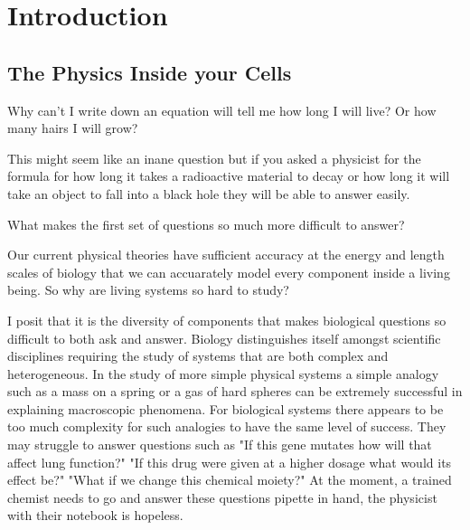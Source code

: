 \chapter{Introduction}
\setcounter{page}{1}
\label{chap:intro}
 {}

\section{The Physics Inside your Cells}
\chapquote{}{}

\vskip 0.5cm

Why can't I  write down an equation will tell me how long I will live? Or how many hairs I will grow?

This might seem like an inane question but if you asked a physicist for the formula for how long it takes a radioactive material to decay or how long it will take an object to fall into a black hole they will be able to answer easily.

What makes the first set of questions so much more difficult to answer?

Our current physical theories have sufficient accuracy at the energy and length scales of biology that we can accuarately model every component inside a living being\cite{carroll2021}. So why are living systems so hard to study?

I posit that it is the diversity of components that makes biological questions so difficult to both ask and answer. Biology distinguishes itself amongst scientific disciplines requiring the study of systems that are both complex and heterogeneous. In the study of more simple physical systems a simple analogy such as a mass on a spring or a gas of hard spheres can be extremely successful in explaining macroscopic phenomena. For biological systems there appears to be too much complexity for such analogies to have the same level of success. They may struggle to answer questions such as "If this gene mutates how will that affect lung function?" "If this drug were given at a higher dosage what would its effect be?" "What if we change this chemical moiety?" At the moment, a trained chemist needs to go and answer these questions pipette in hand, the physicist with their notebook is hopeless.

